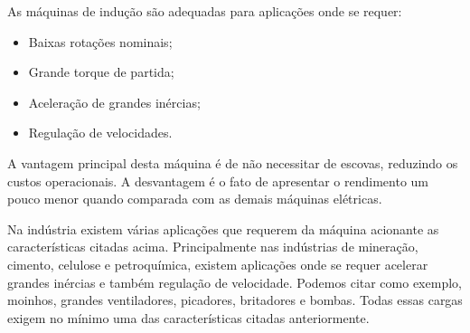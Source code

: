 As máquinas de indução são adequadas para aplicações onde se requer:
\begin{itemize}
\item Baixas rotações nominais;
\item Grande torque de partida;
\item Aceleração de grandes inércias;
\item Regulação de velocidades.
\end{itemize}

A vantagem principal desta máquina é de não necessitar de escovas, reduzindo os custos operacionais. A desvantagem é o fato de apresentar o rendimento um pouco menor quando comparada com as demais máquinas elétricas.

Na indústria existem várias aplicações que requerem da máquina acionante as características citadas acima. Principalmente nas indústrias de mineração, cimento, celulose e petroquímica, existem aplicações onde se requer acelerar grandes inércias e também regulação de velocidade. Podemos citar como exemplo, moinhos, grandes ventiladores, picadores, britadores e bombas. Todas essas cargas exigem no mínimo uma das características citadas anteriormente.

